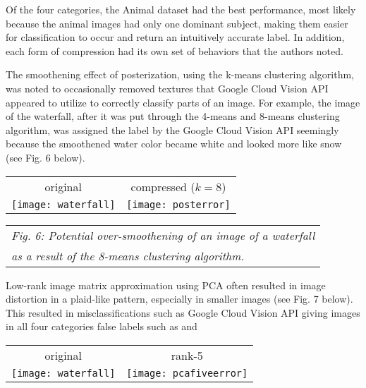 \documentclass[letterpaper, 12 pt, conference]{ieeeconf}  %
\begin{document}
Of the four categories, the Animal dataset had the best
performance, most likely because the animal images had only
one dominant subject, making them easier for classification to occur and return an intuitively accurate label.
In addition, each form of
compression had its own set of behaviors that the authors noted.

The smoothening effect of posterization, using the k-means clustering
algorithm, was noted to occasionally removed textures that Google Cloud Vision API appeared to utilize to correctly classify parts of an image. For example,
the image of the waterfall, after it was put through the
4-means and 8-means clustering algorithm, was assigned the label 
by the Google Cloud Vision API seemingly because the smoothened water color became white and looked more like snow (see Fig. 6 below).

\vspace*{3mm}
\begin{tabular}{c c}
	original & compressed ($k=8$) \\
	\texttt{[image: waterfall]} &
		\texttt{[image: posterror]} \\
\end{tabular}
\begin{tabular}{l}
	\hspace*{4mm} {\it Fig. 6: Potential over-smoothening of an image of a waterfall} \\
	\hspace*{4mm} {\it as a result of the 8-means clustering algorithm.} \\
\end{tabular}
\vspace*{3mm}

Low-rank image matrix approximation using PCA often resulted in
image distortion in a plaid-like pattern, especially in smaller
images (see Fig. 7 below). This resulted in misclassifications
such as Google Cloud Vision API giving images in all four categories
false labels such as  
and 

\vspace*{3mm}
\begin{tabular}{c c}
	original & rank-5 \\
	\texttt{[image: waterfall]} &
		\texttt{[image: pcafiveerror]} \\
\end{tabular}
\end{document}
